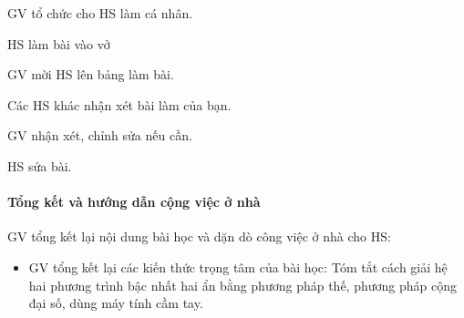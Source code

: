 \tochucthuchien

\begin{tcth}[baitap={từ 1.10 đến 1.14}]
	\buocmot
	\item GV tổ chức cho HS làm cá nhân.
	\buochai
	\item HS làm bài vào vở
	\item GV mời HS lên bảng làm bài.
	\buocba
	\item Các HS khác nhận xét bài làm của bạn.
	\buocbon
	\item GV nhận xét, chỉnh sửa nếu cần. 
	\item HS sửa bài.
\end{tcth}

\paragraph{Tổng kết và hướng dẫn cộng việc ở nhà}

GV tổng kết lại nội dung bài học và dặn dò công việc ở nhà cho HS:

\begin{itemize}
	\item GV tổng kết lại các kiến thức trọng tâm của bài học: Tóm tắt cách giải hệ hai phương trình bậc nhất hai ẩn bằng phương pháp thế, phương pháp cộng đại số, dùng máy tính cầm tay.
\end{itemize}